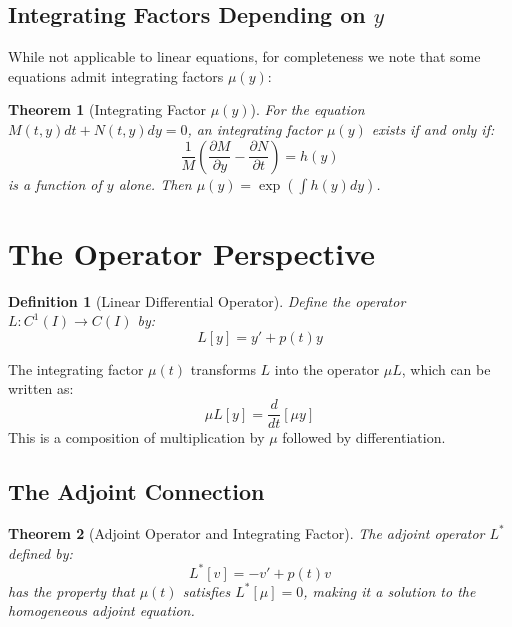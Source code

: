 \documentclass[12pt]{article}
\newtheorem{definition}{Definition}
\newtheorem{theorem}{Theorem}
\begin{document}
\subsection{Integrating Factors Depending on $y$}

While not applicable to linear equations, for completeness we note that some equations admit integrating factors $\mu(y)$:

\begin{theorem}[Integrating Factor $\mu(y)$]
For the equation $M(t,y)dt + N(t,y)dy = 0$, an integrating factor $\mu(y)$ exists if and only if:
\begin{equation}
\frac{1}{M}\left(\frac{\partial M}{\partial y} - \frac{\partial N}{\partial t}\right) = h(y)
\end{equation}
is a function of $y$ alone. Then $\mu(y) = \exp\left(\int h(y)dy\right)$.
\end{theorem}

\section{The Operator Perspective}

\begin{definition}[Linear Differential Operator]
Define the operator $L: C^1(I) \to C(I)$ by:
\begin{equation}
L[y] = y' + p(t)y
\end{equation}
\end{definition}

\begin{keypoint}
The integrating factor $\mu(t)$ transforms $L$ into the operator $\mu L$, which can be written as:
\begin{equation}
\mu L[y] = \frac{d}{dt}[\mu y]
\end{equation}
This is a composition of multiplication by $\mu$ followed by differentiation.
\end{keypoint}

\subsection{The Adjoint Connection}

\begin{theorem}[Adjoint Operator and Integrating Factor]
The adjoint operator $L^*$ defined by:
\begin{equation}
L^*[v] = -v' + p(t)v
\end{equation}
has the property that $\mu(t)$ satisfies $L^*[\mu] = 0$, making it a solution to the homogeneous adjoint equation.
\end{theorem}
\end{document}
